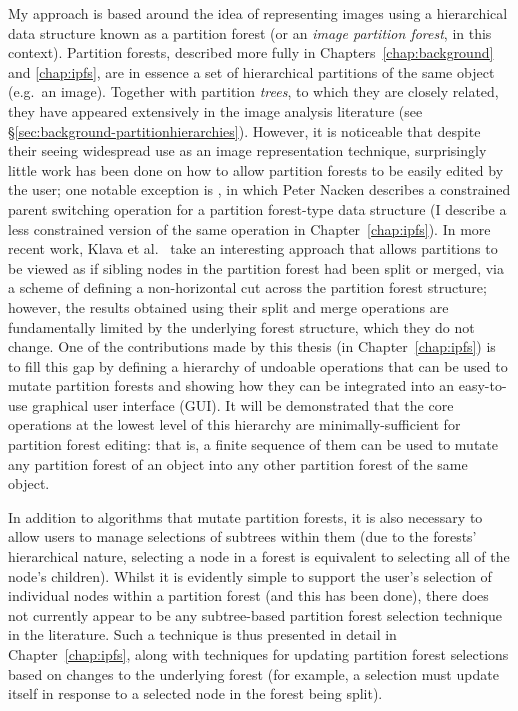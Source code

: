 My approach is based around the idea of representing images using a hierarchical data structure known as a partition forest (or an \emph{image partition forest}, in this context). Partition forests, described more fully in Chapters~\ref{chap:background} and \ref{chap:ipfs}, are in essence a set of hierarchical partitions of the same object (e.g.~an image). Together with partition \emph{trees}, to which they are closely related, they have appeared extensively in the image analysis literature (see \S\ref{sec:background-partitionhierarchies}). However, it is noticeable that despite their seeing widespread use as an image representation technique, surprisingly little work has been done on how to allow partition forests to be easily edited by the user; one notable exception is \cite{nacken95}, in which Peter Nacken describes a constrained parent switching operation for a partition forest-type data structure (I describe a less constrained version of the same operation in Chapter~\ref{chap:ipfs}). In more recent work, Klava et al.~\cite{klava09} take an interesting approach that allows partitions to be viewed as if sibling nodes in the partition forest had been split or merged, via a scheme of defining a non-horizontal cut across the partition forest structure; however, the results obtained using their split and merge operations are fundamentally limited by the underlying forest structure, which they do not change. One of the contributions made by this thesis (in Chapter~\ref{chap:ipfs}) is to fill this gap by defining a hierarchy of undoable operations that can be used to mutate partition forests and showing how they can be integrated into an easy-to-use graphical user interface (GUI). It will be demonstrated that the core operations at the lowest level of this hierarchy are minimally-sufficient for partition forest editing: that is, a finite sequence of them can be used to mutate any partition forest of an object into any other partition forest of the same object.

In addition to algorithms that mutate partition forests, it is also necessary to allow users to manage selections of subtrees within them (due to the forests' hierarchical nature, selecting a node in a forest is equivalent to selecting all of the node's children). Whilst it is evidently simple to support the user's selection of individual nodes within a partition forest (and this has been done), there does not currently appear to be any subtree-based partition forest selection technique in the literature. Such a technique is thus presented in detail in Chapter~\ref{chap:ipfs}, along with techniques for updating partition forest selections based on changes to the underlying forest (for example, a selection must update itself in response to a selected node in the forest being split).

